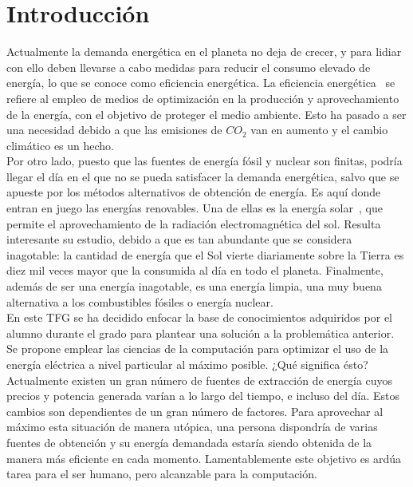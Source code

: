 \chapter{Introducción}
\label{cap:Introduccion}
Actualmente la demanda energética en el planeta no deja de crecer, y para lidiar con ello deben llevarse a cabo medidas para reducir el consumo elevado de energía, lo que se conoce como eficiencia energética. La eficiencia energética~\cite{GarSa12} se refiere al empleo de medios de optimización en la producción y aprovechamiento de la energía, con el objetivo de proteger el medio ambiente. Esto ha pasado a ser una necesidad debido a que las emisiones de $ CO_{2} $ van en aumento y el cambio climático es un hecho.\\

Por otro lado, puesto que las fuentes de energía fósil y nuclear son finitas, podría llegar el día en el que no se pueda satisfacer la demanda energética, salvo que se apueste por los métodos alternativos de obtención de energía. Es aquí donde entran en juego las energías renovables. Una de ellas es la energía solar~\cite{Perp12}, que permite el aprovechamiento de la radiación electromagnética del sol. Resulta interesante su estudio, debido a que es tan abundante que se considera inagotable: la cantidad de energía que el Sol vierte diariamente sobre la Tierra es diez mil veces mayor que la consumida al día en todo el planeta. Finalmente, además de ser una energía inagotable, es una energía limpia, una muy buena alternativa a los combustibles fósiles o energía nuclear. \\

En este \gls{TFG} se ha decidido enfocar la base de conocimientos adquiridos por el alumno durante el grado para plantear una solución a la problemática anterior. Se propone emplear las ciencias de la computación para optimizar el uso de la energía eléctrica a nivel particular al máximo posible. ¿Qué significa ésto? Actualmente existen un gran número de fuentes de extracción de energía cuyos precios y potencia generada varían a lo largo del tiempo, e incluso del día. Estos cambios son dependientes de un gran número de factores. Para aprovechar al máximo esta situación de manera utópica, una persona dispondría de varias fuentes de obtención y su energía demandada estaría siendo obtenida de la manera más eficiente en cada momento. Lamentablemente este objetivo es ardúa tarea para el ser humano, pero alcanzable para la computación.


